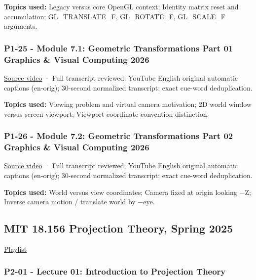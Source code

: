 \textbf{Topics used:} Legacy versus core OpenGL context; Identity matrix reset and accumulation; GL\_TRANSLATE\_F, GL\_ROTATE\_F, GL\_SCALE\_F arguments.

\subsubsection{P1-25 - Module 7.1: Geometric Transformations Part 01 Graphics \& Visual Computing 2026}\label{04-visual-computing-ii-ch036-p1-25---module-7.1-geometric-transformations-part-01-graphics-visual-computing-2026}

\href{https://www.youtube.com/watch?v=oeEe2WiSku8}{Source video} · Full transcript reviewed; YouTube English original automatic captions (en-orig); 30-second normalized transcript; exact cue-word deduplication.

\textbf{Topics used:} Viewing problem and virtual camera motivation; 2D world window versus screen viewport; Viewport-coordinate convention distinction.

\subsubsection{P1-26 - Module 7.2: Geometric Transformations Part 02 Graphics \& Visual Computing 2026}\label{04-visual-computing-ii-ch036-p1-26---module-7.2-geometric-transformations-part-02-graphics-visual-computing-2026}

\href{https://www.youtube.com/watch?v=GnIE0V5dS1w}{Source video} · Full transcript reviewed; YouTube English original automatic captions (en-orig); 30-second normalized transcript; exact cue-word deduplication.

\textbf{Topics used:} World versus view coordinates; Camera fixed at origin looking −Z; Inverse camera motion / translate world by −eye.

\subsection{MIT 18.156 Projection Theory, Spring 2025}\label{04-visual-computing-ii-ch036-mit-18.156-projection-theory-spring-2025}

\href{https://www.youtube.com/playlist?list=PLUl4u3cNGP62K9_7Pg26ytrAOXwXFpN43}{Playlist}

\subsubsection{P2-01 - Lecture 01: Introduction to Projection Theory}\label{04-visual-computing-ii-ch036-p2-01---lecture-01-introduction-to-projection-theory}

